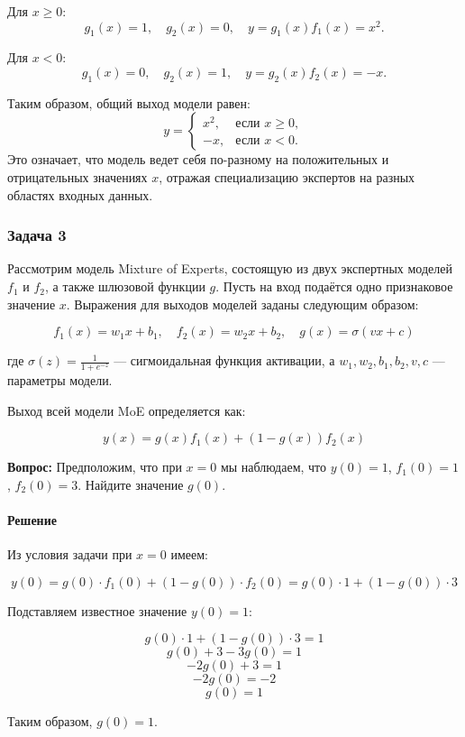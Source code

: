 Для $x \geq 0$: 
$$
g_1(x) = 1, \quad g_2(x) = 0, \quad y = g_1(x) f_1(x) = x^2.
$$

Для $x < 0$: 
$$
g_1(x) = 0, \quad g_2(x) = 1, \quad y = g_2(x) f_2(x) = -x.
$$

Таким образом, общий выход модели равен:
$$
y = 
\begin{cases} 
x^2, & \text{если } x \geq 0, \\ 
-x, & \text{если } x < 0.
\end{cases}
$$
Это означает, что модель ведет себя по-разному на положительных и отрицательных значениях $x$, отражая специализацию экспертов на разных областях входных данных.

\subsubsection{Задача 3}

Рассмотрим модель Mixture of Experts, состоящую из двух экспертных моделей $f_1$ и $f_2$, а также шлюзовой функции $g$. Пусть на вход подаётся одно признаковое значение $x$. Выражения для выходов моделей заданы следующим образом:

$$
f_1(x) = w_1 x + b_1, \quad f_2(x) = w_2 x + b_2, \quad g(x) = \sigma(v x + c)
$$

где $\sigma(z) = \frac{1}{1 + e^{-z}}$ — сигмоидальная функция активации, а $w_1, w_2, b_1, b_2, v, c$ — параметры модели.

Выход всей модели MoE определяется как:

$$
y(x) = g(x) f_1(x) + (1 - g(x)) f_2(x)
$$

\textbf{Вопрос:} Предположим, что при $x = 0$ мы наблюдаем, что $y(0) = 1$, $f_1(0) = 1$, $f_2(0) = 3$. Найдите значение $g(0)$.

\paragraph{Решение}

Из условия задачи при $x = 0$ имеем:

$$
y(0) = g(0) \cdot f_1(0) + (1 - g(0)) \cdot f_2(0) = g(0) \cdot 1 + (1 - g(0)) \cdot 3
$$

Подставляем известное значение $y(0) = 1$:

$$
g(0) \cdot 1 + (1 - g(0)) \cdot 3 = 1
$$
$$
g(0) + 3 - 3g(0) = 1
$$
$$
-2g(0) + 3 = 1
$$
$$
-2g(0) = -2
$$
$$
g(0) = 1
$$

Таким образом, $g(0) = 1$.


